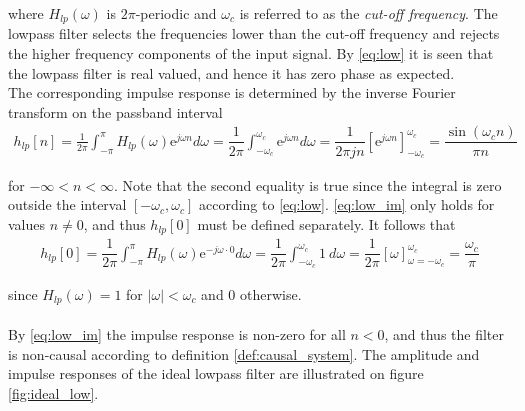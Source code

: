 where $H_{lp}(\omega)$ is $2\pi$-periodic and $\omega_c$ is referred to as the \textit{cut-off frequency}. The lowpass filter selects the frequencies lower than the cut-off frequency and rejects the higher frequency components of the input signal. By \eqref{eq:low} it is seen that the lowpass filter is real valued, and hence it has zero phase as expected. \\
The corresponding impulse response is determined by the inverse Fourier transform on the passband interval
\begin{align} \label{eq:low_im}
h_{lp}[n] = \frac{1}{2\pi} \int_{-\pi}^{\pi} H_{lp}(\omega) \text{e}^{j\omega n} d\omega = \dfrac{1}{2\pi}\int_{-\omega_c}^{\omega_c}\text{e}^{j\omega n} d\omega = \dfrac{1}{2\pi j n}\left[\text{e}^{j\omega n} \right]_{-\omega_c}^{\omega_c} = \dfrac{\sin(\omega_c n)}{\pi n}
\end{align}

for $-\infty < n < \infty$. Note that the second equality is true since the integral is zero outside the interval $[-\omega_c, \omega_c]$ according to \eqref{eq:low}. \eqref{eq:low_im} only holds for values $n \neq 0$, and thus $h_{lp}[0]$ must be defined separately. It follows that
\begin{align*}
h_{lp}[0] = \dfrac{1}{2\pi} \int_{-\pi}^\pi H_{lp}(\omega) \text{e}^{-j \omega \cdot 0} d\omega = \dfrac{1}{2\pi} \int_{-\omega_c}^{\omega_c} 1 \ d\omega = \dfrac{1}{2\pi} \left[ \omega \right]_{\omega = -\omega_c}^{\omega_c} = \dfrac{\omega_c}{\pi}
\end{align*}

since $H_{lp}(\omega) = 1$ for $|\omega| < \omega_c$ and $0$ otherwise.
\\ \\
By \eqref{eq:low_im} the impulse response is non-zero for all $n<0$, and thus the filter is non-causal according to definition \ref{def:causal_system}.
The amplitude and impulse responses of the ideal lowpass filter are illustrated on figure \ref{fig:ideal_low}.

